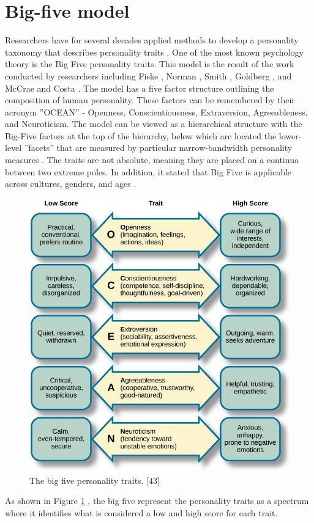 \section{Big-five model}
\label{sec:big-five_model}
Researchers have for several decades applied methods to develop a personality taxonomy that describes personality traits \cite{personality_goldberg_1990}. One of the most known psychology theory is the Big Five personality traits. This model is the result of the work conducted by researchers including Fiske \cite{fiske1949consistency}, Norman \cite{norman19672800}, Smith \cite{smith1967usefulness}, Goldberg \cite{goldberg1981language}, and McCrae and Costa \cite{mccrae1987validation}. The model has a five factor structure outlining the composition of human personality. These factors can be remembered by their acronym ''OCEAN'' - Openness, Conscientiousness, Extraversion, Agreeableness, and Neuroticism. The model can be viewed as a hierarchical structure with the Big-Five factors at the top of the hierarchy, below which are located the lower-level ''facets'' that are measured by particular narrow-bandwidth personality measures \cite{Bandwidth-goldberg1999broad}. The traits are not absolute, meaning they are placed on a continua between two extreme poles. In addition, it stated that Big Five is applicable across cultures, genders, and ages \cite{big-five-john1999big}.  
%
\begin{figure}[h]
  \centering
  \includegraphics[width=\textwidth]{figures/big-5-personality.jpeg}
  \caption{The big five personality traits. [43]}
  \label{fig:big5}
\end{figure}
%
As shown in Figure \ref{fig:big5} \cite{big5-image}, the big five  represent the personality traits as a spectrum where it identifies what is considered a low and high score for each trait. \\

